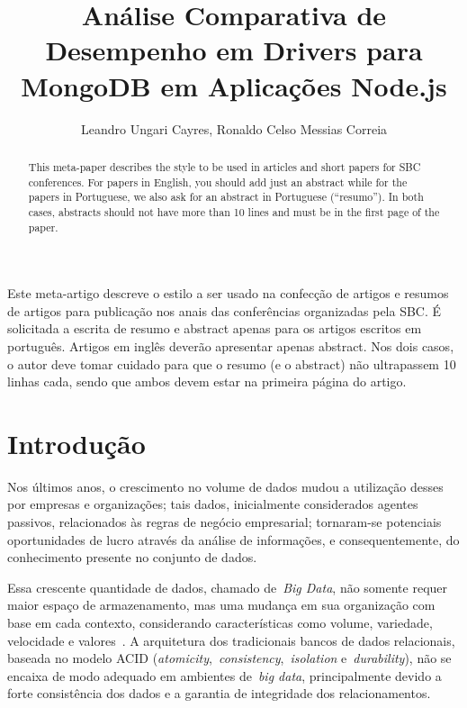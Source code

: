 \documentclass[12pt]{article}
\title{Análise Comparativa de Desempenho em Drivers para MongoDB em Aplicações Node.js}
\author{Leandro Ungari Cayres, Ronaldo Celso Messias Correia }
\begin{document}
 

\maketitle

\begin{abstract}
  This meta-paper describes the style to be used in articles and short papers
  for SBC conferences. For papers in English, you should add just an abstract
  while for the papers in Portuguese, we also ask for an abstract in
  Portuguese (``resumo''). In both cases, abstracts should not have more than
  10 lines and must be in the first page of the paper.
\end{abstract}
     
\begin{resumo} 
  Este meta-artigo descreve o estilo a ser usado na confecção de artigos e
  resumos de artigos para publicação nos anais das conferências organizadas
  pela SBC. É solicitada a escrita de resumo e abstract apenas para os artigos
  escritos em português. Artigos em inglês deverão apresentar apenas abstract.
  Nos dois casos, o autor deve tomar cuidado para que o resumo (e o abstract)
  não ultrapassem 10 linhas cada, sendo que ambos devem estar na primeira
  página do artigo.
\end{resumo}


\section{Introdução}
Nos últimos anos, o crescimento no volume de dados mudou a utilização desses por empresas e organizações; tais dados, inicialmente considerados agentes passivos, relacionados às regras de negócio empresarial; tornaram-se potenciais oportunidades de lucro através da análise de informações, e consequentemente, do conhecimento presente no conjunto de dados.

Essa crescente quantidade de dados, chamado de~\emph{Big Data}, não somente requer maior espaço de armazenamento, mas uma mudança em sua organização com base em cada contexto, considerando características como volume, variedade, velocidade e valores~\cite{ward2013undefined}.
A arquitetura dos tradicionais bancos de dados relacionais, baseada no modelo ACID (\textit{atomicity},~\textit{consistency},~\textit{isolation} e~\textit{durability}), não se encaixa de modo adequado em ambientes de~\emph{big data}, principalmente devido a forte consistência dos dados e a garantia de integridade dos relacionamentos. 
\end{document}
